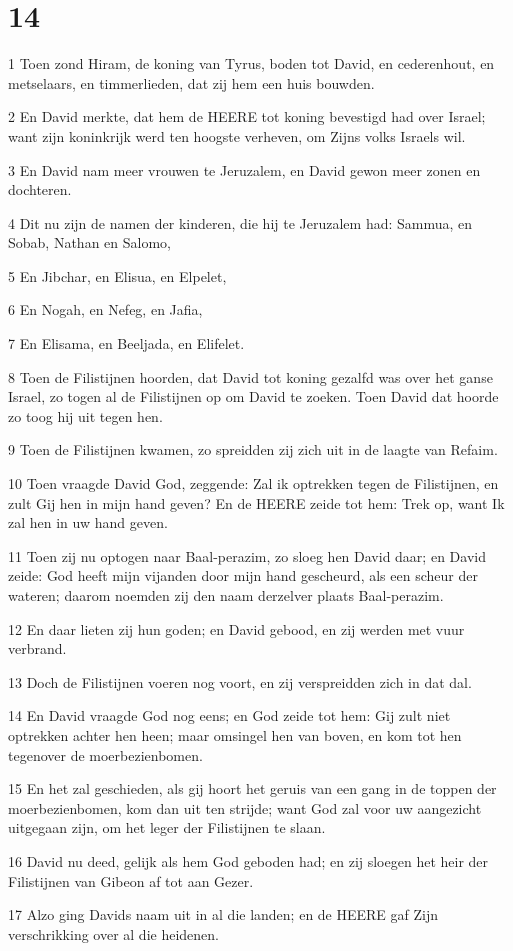 \chapter{14}

\par 1 Toen zond Hiram, de koning van Tyrus, boden tot David, en cederenhout, en metselaars, en timmerlieden, dat zij hem een huis bouwden.
\par 2 En David merkte, dat hem de HEERE tot koning bevestigd had over Israel; want zijn koninkrijk werd ten hoogste verheven, om Zijns volks Israels wil.
\par 3 En David nam meer vrouwen te Jeruzalem, en David gewon meer zonen en dochteren.
\par 4 Dit nu zijn de namen der kinderen, die hij te Jeruzalem had: Sammua, en Sobab, Nathan en Salomo,
\par 5 En Jibchar, en Elisua, en Elpelet,
\par 6 En Nogah, en Nefeg, en Jafia,
\par 7 En Elisama, en Beeljada, en Elifelet.
\par 8 Toen de Filistijnen hoorden, dat David tot koning gezalfd was over het ganse Israel, zo togen al de Filistijnen op om David te zoeken. Toen David dat hoorde zo toog hij uit tegen hen.
\par 9 Toen de Filistijnen kwamen, zo spreidden zij zich uit in de laagte van Refaim.
\par 10 Toen vraagde David God, zeggende: Zal ik optrekken tegen de Filistijnen, en zult Gij hen in mijn hand geven? En de HEERE zeide tot hem: Trek op, want Ik zal hen in uw hand geven.
\par 11 Toen zij nu optogen naar Baal-perazim, zo sloeg hen David daar; en David zeide: God heeft mijn vijanden door mijn hand gescheurd, als een scheur der wateren; daarom noemden zij den naam derzelver plaats Baal-perazim.
\par 12 En daar lieten zij hun goden; en David gebood, en zij werden met vuur verbrand.
\par 13 Doch de Filistijnen voeren nog voort, en zij verspreidden zich in dat dal.
\par 14 En David vraagde God nog eens; en God zeide tot hem: Gij zult niet optrekken achter hen heen; maar omsingel hen van boven, en kom tot hen tegenover de moerbezienbomen.
\par 15 En het zal geschieden, als gij hoort het geruis van een gang in de toppen der moerbezienbomen, kom dan uit ten strijde; want God zal voor uw aangezicht uitgegaan zijn, om het leger der Filistijnen te slaan.
\par 16 David nu deed, gelijk als hem God geboden had; en zij sloegen het heir der Filistijnen van Gibeon af tot aan Gezer.
\par 17 Alzo ging Davids naam uit in al die landen; en de HEERE gaf Zijn verschrikking over al die heidenen.

